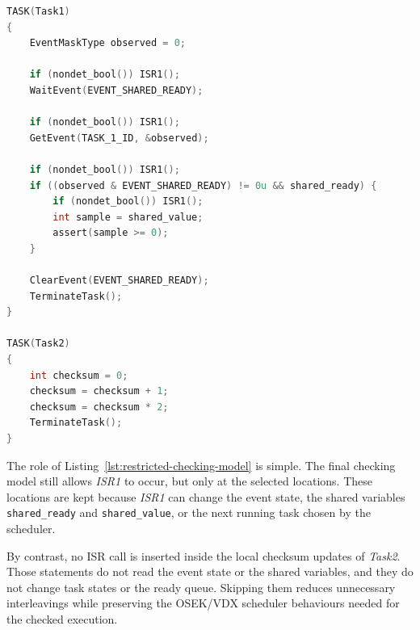 \begin{lstlisting}[language=C,caption={Illustrative checking model with selected ISR calls for the running example.},label={lst:restricted-checking-model}]
TASK(Task1)
{
    EventMaskType observed = 0;
    
    if (nondet_bool()) ISR1();
    WaitEvent(EVENT_SHARED_READY);
    
    if (nondet_bool()) ISR1();
    GetEvent(TASK_1_ID, &observed);
    
    if (nondet_bool()) ISR1();
    if ((observed & EVENT_SHARED_READY) != 0u && shared_ready) {
        if (nondet_bool()) ISR1();
        int sample = shared_value;
        assert(sample >= 0);
    }

    ClearEvent(EVENT_SHARED_READY);
    TerminateTask();
}

TASK(Task2)
{
    int checksum = 0;
    checksum = checksum + 1;
    checksum = checksum * 2;
    TerminateTask();
}
\end{lstlisting}

The role of Listing~\ref{lst:restricted-checking-model} is simple. The final checking model still allows \textit{ISR1} to occur, but only at the selected locations. These locations are kept because \textit{ISR1} can change the event state, the shared variables \texttt{shared\_ready} and \texttt{shared\_value}, or the next running task chosen by the scheduler.

By contrast, no ISR call is inserted inside the local checksum updates of \textit{Task2}. Those statements do not read the event state or the shared variables, and they do not change task states or the ready queue. Skipping them reduces unnecessary interleavings while preserving the OSEK/VDX scheduler behaviours needed for the checked execution.

